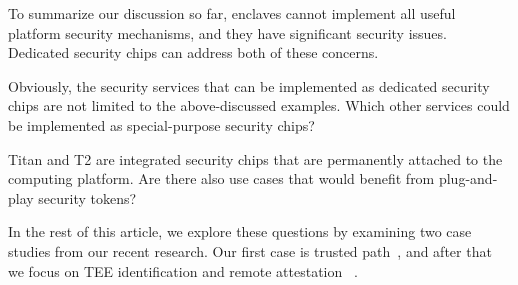 To summarize our discussion so far, enclaves cannot implement all useful platform security mechanisms, and they have significant security issues. Dedicated security chips can address both of these concerns. 

Obviously, the security services that can be implemented as dedicated security chips are not limited to the above-discussed examples. Which other services could be implemented as special-purpose security chips? 

Titan and T2 are integrated security chips that are permanently attached to the computing platform. Are there also use cases that would benefit from plug-and-play security tokens?

In the rest of this article, we explore these questions by examining two case studies from our recent research. Our first case is trusted path~\cite{protection},  and after that we focus on TEE identification and remote attestation~\cite{proximitee} .

